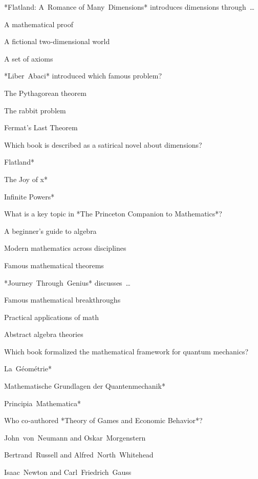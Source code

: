 \begin{enhancedmcq}{*Flatland: A Romance of Many Dimensions* introduces dimensions through …}
\item A mathematical proof
\item A fictional two‑dimensional world
\item A set of axioms

\end{enhancedmcq}
\begin{enhancedmcq}{*Liber Abaci* introduced which famous problem?}
\item The Pythagorean theorem
\item The rabbit problem
\item Fermat's Last Theorem

\end{enhancedmcq}
\begin{enhancedmcq}{Which book is described as a satirical novel about dimensions?}
\item *Flatland*
\item *The Joy of x*
\item *Infinite Powers*

\end{enhancedmcq}
\begin{enhancedmcq}{What is a key topic in *The Princeton Companion to Mathematics*?}
\item A beginner's guide to algebra
\item Modern mathematics across disciplines
\item Famous mathematical theorems

\end{enhancedmcq}
\begin{enhancedmcq}{*Journey Through Genius* discusses …}
\item Famous mathematical breakthroughs
\item Practical applications of math
\item Abstract algebra theories

\end{enhancedmcq}
\begin{enhancedmcq}{Which book formalized the mathematical framework for quantum mechanics?}
\item *La Géométrie*
\item *Mathematische Grundlagen der Quantenmechanik*
\item *Principia Mathematica*

\end{enhancedmcq}
\begin{enhancedmcq}{Who co‑authored *Theory of Games and Economic Behavior*?}
\item John von Neumann and Oskar Morgenstern
\item Bertrand Russell and Alfred North Whitehead
\item Isaac Newton and Carl Friedrich Gauss

\end{enhancedmcq}
